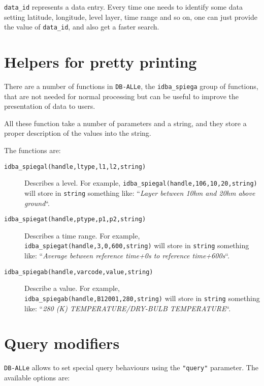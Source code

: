 \documentclass[final,12pt,a4paper,twoside]{book}
\newcommand{\dballe}{{\tt DB-ALLe}}
\begin{document}
{\tt data\_id} represents a data entry.  Every time one needs to identify some
data setting latitude, longitude, level layer, time range and so on, one can
just provide the value of {\tt data\_id}, and also get a faster search.

\section{Helpers for pretty printing}

\label{fun-pprint}

There are a number of functions in \dballe{}, the {\tt idba\_spiega\*} group of
functions, that are not needed for normal processing but can be useful to
improve the presentation of data to users.

All these function take a number of parameters and a string, and they store a
proper description of the values into the string.

The functions are:

\begin{description}
\item[{\tt idba\_spiegal(handle,ltype,l1,l2,string)}]
  Describes a level.  For example, {\tt idba\_spiegal(handle,106,10,20,string)}
  will store in {\tt string} something like: ``\emph{Layer between 10hm and
  20hm above ground}``.
\item[{\tt idba\_spiegat(handle,ptype,p1,p2,string)}]
  Describes a time range.  For example, {\tt idba\_spiegat(handle,3,0,600,string)}
  will store in {\tt string} something like: ``\emph{Average between reference
  time+0s to reference time+600s}``.
\item[{\tt idba\_spiegab(handle,varcode,value,string)}]
  Describe a value.  For example, {\tt idba\_spiegab(handle,B12001,280,string)}
  will store in {\tt string} something like: ``\emph{280 (K)
  TEMPERATURE/DRY-BULB TEMPERATURE}``.
\end{description}

\section{Query modifiers}

\dballe{} allows to set special query behaviours using the {\tt "query"}
parameter.  The available options are:
\end{document}
